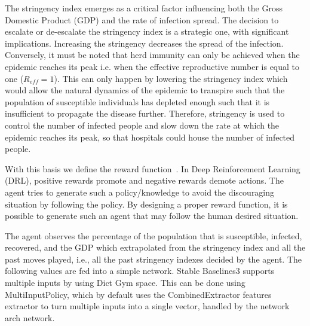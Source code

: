 \documentclass[tikz,fleqn,12pt]{wlscirep}
\begin{document}
The stringency index emerges as a critical factor influencing both the Gross Domestic Product (GDP) and the rate of infection spread. The decision to escalate or de-escalate the stringency index is a strategic one, with significant implications. Increasing the stringency decreases the spread of the infection. Conversely, it must be noted that herd immunity can only be achieved when the epidemic reaches its peak i.e. when the effective reproductive number is equal to one ($R_{eff} = 1$). This can only happen by lowering the stringency index which would allow the natural dynamics of the epidemic to transpire such that the population of susceptible individuals has depleted enough such that it is insufficient to propagate the disease further. Therefore, stringency is used to control the number of infected people and slow down the rate at which the epidemic reaches its peak, so that hospitals could house the number of infected people.

With this basis we define the reward function~\cite{Ohi2020}. In Deep Reinforcement Learning (DRL), positive rewards promote and negative rewards demote actions. The agent tries to generate such a policy/knowledge to avoid the discouraging situation by following the policy. By designing a proper reward function, it is possible to generate such an agent that may follow the human desired situation.

The agent observes the percentage of the population that is susceptible, infected, recovered, and the GDP which extrapolated from the stringency index and all the past moves played, i.e., all the past stringency indexes decided by the agent. The following values are fed into a simple network. Stable Baselines3 supports multiple inputs by using Dict Gym space. This can be done using MultiInputPolicy, which by default uses the CombinedExtractor features extractor to turn multiple inputs into a single vector, handled by the network arch network.
\end{document}
